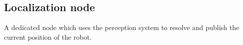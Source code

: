 \subsection{Localization node} A dedicated node which uses the perception system to resolve and publish the current position of the robot.
